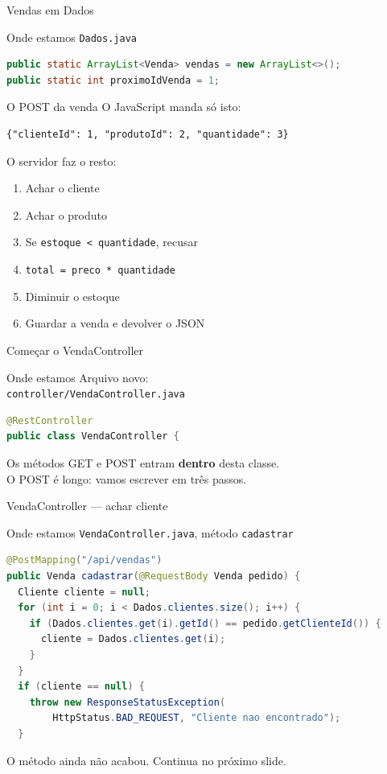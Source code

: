 \documentclass[aspectratio=169,11pt]{beamer}
\newcommand{\onde}[1]{%
  \begin{block}{Onde estamos}
    #1
  \end{block}
}
\begin{document}
\begin{frame}[fragile]{Vendas em Dados}
  \onde{\texttt{Dados.java}}

\begin{lstlisting}[language=Java,basicstyle=\ttfamily\footnotesize]
public static ArrayList<Venda> vendas = new ArrayList<>();
public static int proximoIdVenda = 1;
\end{lstlisting}
\end{frame}

\begin{frame}[fragile]{O POST da venda}
  O JavaScript manda só isto:

\begin{lstlisting}[basicstyle=\ttfamily\footnotesize]
{"clienteId": 1, "produtoId": 2, "quantidade": 3}
\end{lstlisting}

  \vspace{0.4em}
  O servidor faz o resto:
  \begin{enumerate}
    \item Achar o cliente
    \item Achar o produto
    \item Se \texttt{estoque < quantidade}, recusar
    \item \texttt{total = preco * quantidade}
    \item Diminuir o estoque
    \item Guardar a venda e devolver o JSON
  \end{enumerate}
\end{frame}

\begin{frame}[fragile]{Começar o VendaController}
  \onde{Arquivo novo:\\
        \texttt{controller/VendaController.java}}

\begin{lstlisting}[language=Java,basicstyle=\ttfamily\footnotesize]
@RestController
public class VendaController {
\end{lstlisting}

  Os métodos GET e POST entram \textbf{dentro} desta classe.\\
  O POST é longo: vamos escrever em três passos.
\end{frame}

\begin{frame}[fragile]{VendaController --- achar cliente}
  \onde{\texttt{VendaController.java}, método \texttt{cadastrar}}

\begin{lstlisting}[language=Java,basicstyle=\ttfamily\footnotesize]
@PostMapping("/api/vendas")
public Venda cadastrar(@RequestBody Venda pedido) {
  Cliente cliente = null;
  for (int i = 0; i < Dados.clientes.size(); i++) {
    if (Dados.clientes.get(i).getId() == pedido.getClienteId()) {
      cliente = Dados.clientes.get(i);
    }
  }
  if (cliente == null) {
    throw new ResponseStatusException(
        HttpStatus.BAD_REQUEST, "Cliente nao encontrado");
  }
\end{lstlisting}

  O método ainda não acabou. Continua no próximo slide.
\end{frame}
\end{document}
